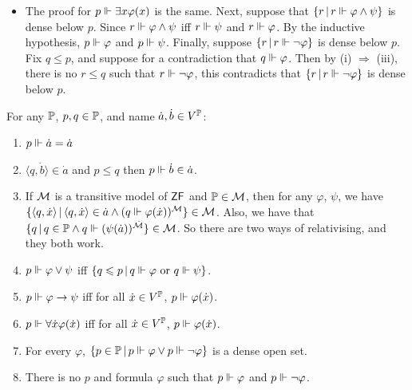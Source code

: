\documentclass{article}
\begin{document}
\begin{enumerate}
\begin{itemize}
                  \item The proof for $p \Vdash \exists x \varphi(x)$ is the same.\gap
                        Next, suppose that $\{r \, | \, r \Vdash \varphi \wedge \psi\}$ is dense below $p$. Since $r \Vdash \varphi \wedge \psi$ iff $r \Vdash \psi$ and $r \Vdash \varphi$. By the inductive hypothesis, $p \Vdash \varphi$ and $p \Vdash \psi$.\gap
                        Finally, suppose $\{r \, | \, r \Vdash \neg \varphi\}$ is dense below $p$. Fix $q \leq p$, and suppose for a contradiction that $q \Vdash \varphi$. Then by (i) $\Rightarrow$ (iii), there is no $r \leq q$ such that $r \Vdash \neg \varphi$, this contradicts that $\{r \, | \, r \Vdash \neg \varphi\}$ is dense below $p$.
              \end{itemize}
    \end{enumerate}
    \endproof
    \begin{fancyprop}{}
        For any $\mathbb{P}$, $p,q \in \mathbb{P}$, and name $\dot{a}, \dot{b} \in V^{\mathbb{P}}$: \begin{enumerate}
            \item[(i)] $p \Vdash \dot{a}=\dot{a}$
            \item[(ii)]$\langle q, \dot{b}\rangle \in \dot{a}$ and $p \leq q$ then $p \Vdash \dot{b} \in \dot{a}$.
            \item[(iii)] If $\mathcal{M}$ is a transitive model of $\mathsf{ZF}$ and $\mathbb{P} \in \mathcal{M}$, then for any $\varphi$, $\psi$, we have $\{ \langle q, \dot{x} \rangle \, | \, \langle q, \dot{x} \rangle \in \dot{a} \wedge (q \Vdash \varphi(\dot{x}))^{\mathcal{M}} \} \in \mathcal{M}$. Also, we have that $\{q \, | \, q \in \mathbb{P} \wedge q \Vdash (\psi(\dot{a}))^{\check{\mathcal{M}}} \} \in \mathcal{M}$. So there are two ways of relativising, and they both work.
            \item[(iv)] $p \Vdash \varphi \vee \psi$ iff $\{ q\leqslant p \, | \, q \Vdash \varphi \text{ or } q \Vdash \psi\}$.
            \item[(v)] $p \Vdash \varphi \rightarrow \psi$ iff for all $\dot{x} \in V^{\mathbb{P}}$, $p \Vdash \varphi(\dot{x})$.
            \item[(vi)] $p \Vdash \forall \dot{x} \varphi(\dot{x})$ iff for all $\dot{x} \in V^{\mathbb{P}}$, $p \Vdash \varphi(\dot{x})$.
            \item[(vii)] For every $\varphi$, $\{ p \in \mathbb{P} \, | \, p \Vdash \varphi \vee p \Vdash \neg \varphi\}$ is a dense open set.
            \item[(viii)] There is no $p$ and formula $\varphi$ such that $p \Vdash \varphi$ and $p \Vdash \neg \varphi$.
        \end{enumerate}
    \end{fancyprop}
\end{document}
